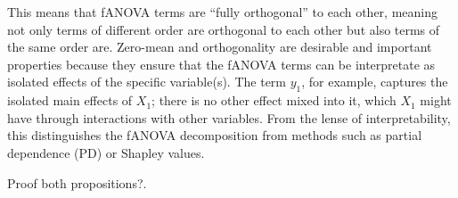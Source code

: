 This means that fANOVA terms are ``fully orthogonal'' to each other, meaning not only terms of different order are orthogonal to each other but also terms of the same order are. Zero-mean and orthogonality are desirable and important properties because they ensure that the fANOVA terms can be interpretate as isolated effects of the specific variable(s). The term $y_1$, for example, captures the isolated main effects of $X_1$; there is no other effect mixed into it, which $X_1$ might have through interactions with other variables. From the lense of interpretability, this distinguishes the fANOVA decomposition from methods such as partial dependence (PD) or Shapley values.\par

{\color{blue} Proof both propositions?}.

